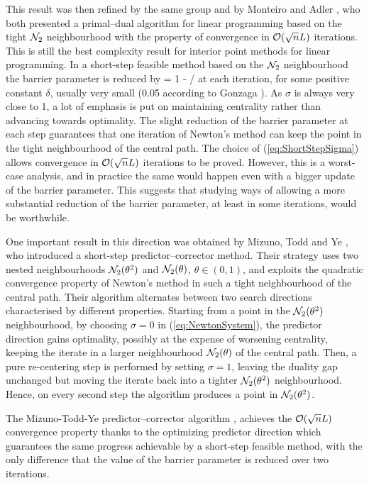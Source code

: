 This result was then refined by the same group \cite{KojimaMizunoYoshise89b} 
and by Monteiro and Adler \cite{MonteiroAdler89a},
who both presented a primal--dual algorithm for linear programming 
based on the tight $\mathcal{N}_2$ neighbourhood
with the property of convergence in $\mathcal{O}(\sqrt{n}L)$ iterations.
This is still the best complexity result for interior point methods
for linear programming.
In a short-step feasible method based on the $\mathcal{N}_2$ neighbourhood
the barrier parameter is reduced by 
\be  \label{eq:ShortStepSigma}
   \sigma = 1 - \delta/
\ee
at each iteration, for some positive constant $\delta$, usually
very small (0.05 according to Gonzaga \cite{Gonzaga91a}).
As $\sigma$ is always very close to 1, a lot of emphasis is put 
on maintaining centrality rather than advancing towards optimality. 
%
The slight reduction of the barrier parameter at
each step guarantees that one iteration of Newton's
method can keep the point in the tight neighbourhood of the central path.
The choice of (\ref{eq:ShortStepSigma}) allows convergence
in $\mathcal{O}(\sqrt{n}L)$ iterations to be proved.
However, this is a worst-case analysis, and in practice the same would happen
even with a bigger update of the barrier parameter. This suggests that
studying ways of allowing a more substantial reduction of the barrier
parameter, at least in some iterations, would be worthwhile. 

One important result in this direction was obtained by 
Mizuno, Todd and Ye \cite{MizunoToddYe}, who introduced a short-step 
predictor--corrector method. Their strategy uses two nested neighbourhoods 
$\mathcal{N}_2(\theta^2)$ and $\mathcal{N}_2(\theta)$, $\theta \in (0,1)$, 
and exploits the
quadratic convergence property of Newton's method in such a tight
neighbourhood of the central path.
Their algorithm alternates between two search directions characterised by
different properties.
Starting from a point in the $\mathcal{N}_2(\theta^2)$ neighbourhood,
by choosing $\sigma = 0$ in (\ref{eq:NewtonSystem}),
the predictor direction gains optimality, possibly at the expense of
worsening centrality, keeping the iterate in a larger neighbourhood
$\mathcal{N}_2(\theta)$ of the central path. 
Then, a pure re-centering step is performed by setting $\sigma = 1$,
leaving the duality gap unchanged but moving the iterate back into a 
tighter $\mathcal{N}_2(\theta^2)$ neighbourhood. Hence, on every second step the 
algorithm produces a point in $\mathcal{N}_2(\theta^2)$.

The Mizuno-Todd-Ye predictor--corrector algorithm \cite{MizunoToddYe},
achieves the $\mathcal{O}(\sqrt{n}L)$ convergence property
thanks to the optimizing predictor
direction which guarantees the same progress achievable by a short-step 
feasible method, with the only 
difference that the value of the barrier parameter is reduced over
two iterations.

